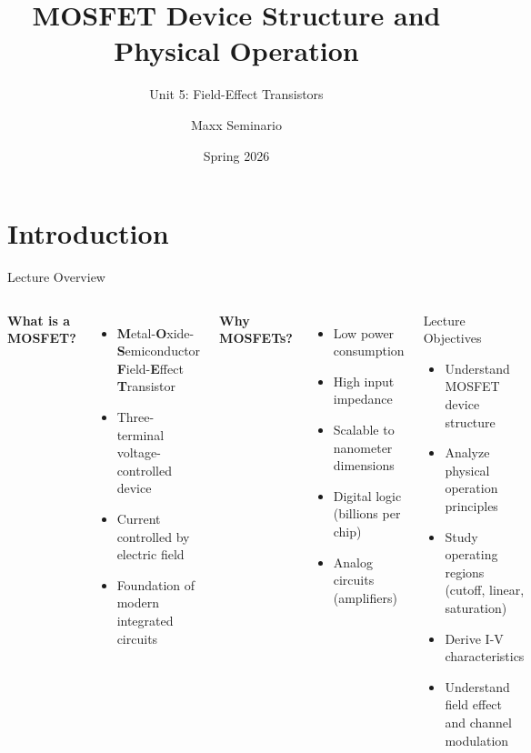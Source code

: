 \documentclass[10pt, aspectratio=169]{beamer}
\title[MOSFET Structure]{MOSFET Device Structure and Physical Operation}
\subtitle{Unit 5: Field-Effect Transistors}
\author{Maxx Seminario}
\institute{University of Nebraska-Lincoln}
\date{Spring 2026}
\begin{document}
\begin{frame}
  \titlepage
\end{frame}

\section{Introduction}

\begin{frame}{Lecture Overview}
    
    \begin{columns}[t]
        \textbf{What is a MOSFET?}
        
        \begin{itemize}
            \item \textbf{M}etal-\textbf{O}xide-\textbf{S}emiconductor \textbf{F}ield-\textbf{E}ffect \textbf{T}ransistor
            \item Three-terminal voltage-controlled device
            \item Current controlled by electric field
            \item Foundation of modern integrated circuits
        \end{itemize}
        
        \textbf{Why MOSFETs?}
        
        \begin{itemize}
            \item Low power consumption
            \item High input impedance
            \item Scalable to nanometer dimensions
            \item Digital logic (billions per chip)
            \item Analog circuits (amplifiers)
        \end{itemize}
        
        \begin{block}{Lecture Objectives}
            \begin{itemize}
                \item Understand MOSFET device structure
                \item Analyze physical operation principles
                \item Study operating regions (cutoff, linear, saturation)
                \item Derive I-V characteristics
                \item Understand field effect and channel modulation
            \end{itemize}
        \end{block}
        

    \end{columns}
    
\end{frame}
\end{document}
